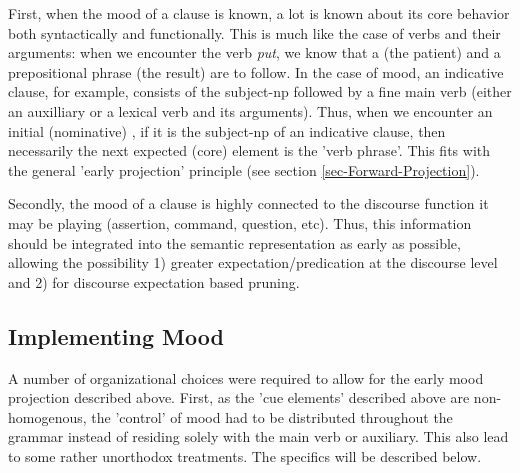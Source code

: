 First, when the mood of a clause is known, a lot is known about its core behavior both syntactically and functionally. This is much like the case of verbs and their arguments: when we encounter the verb \emph{put}, we know that a  (the patient) and a prepositional phrase (the result) are to follow. In the case of mood, an indicative clause, for example,  consists of the subject-np followed by a fine main verb (either an auxilliary or a lexical verb and its arguments). Thus, when we encounter an initial (nominative)  , if it is the subject-np of an indicative clause, then necessarily the next expected (core) element is the 'verb phrase'. This fits with the general 'early projection' principle (see section \ref{sec-Forward-Projection}).

Secondly, the mood of a clause is highly connected to the discourse function it may be playing (assertion, command, question, etc). Thus, this information should be integrated into the semantic representation as early as possible, allowing the possibility 1) greater expectation/predication at the discourse level and 2) for discourse expectation based pruning.

\subsection{Implementing Mood}

A number of organizational choices were required to allow for the early mood projection described above.  First, as the 'cue elements' described above are non-homogenous, the 'control' of mood had to be distributed throughout the grammar instead of residing solely with the main verb or auxiliary. This also lead to some rather unorthodox treatments. The specifics will be described below. 

